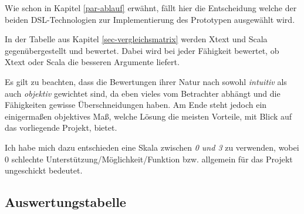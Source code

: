 Wie schon in Kapitel \ref{par-ablauf} erwähnt,
  fällt hier die Entscheidung welche der beiden
  DSL-Technologien zur Implementierung des Prototypen ausgewählt wird.

In der Tabelle aus Kapitel \ref{sec-vergleichsmatrix} werden Xtext und
Scala gegenübergestellt und bewertet.
Dabei wird bei jeder Fähigkeit bewertet,
  ob Xtext oder Scala die besseren Argumente liefert.

Es gilt zu beachten, dass die Bewertungen ihrer Natur nach sowohl
\emph{intuitiv} als auch \emph{objektiv} gewichtet sind, da eben vieles vom
Betrachter abhängt und die Fähigkeiten gewisse Überschneidungen haben.
Am Ende steht jedoch ein einigermaßen objektives Maß,
welche Lösung die meisten Vorteile, mit Blick
auf das vorliegende Projekt, bietet.

Ich habe mich dazu entschieden eine Skala zwischen \emph{0 und 3} zu verwenden,
wobei 0 schlechte Unterstützung/Möglichkeit/Funktion bzw.
allgemein für das Projekt ungeschickt bedeutet.


\subsection{Auswertungstabelle}\label{sec-auswertungstabelle}

